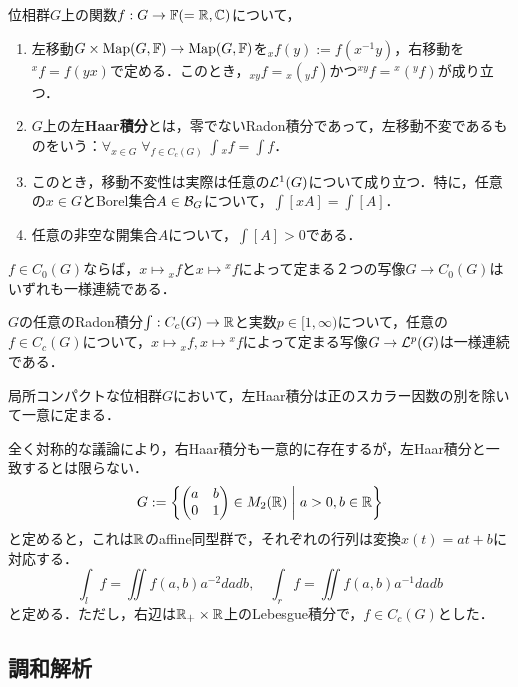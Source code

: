 \documentclass[uplatex,dvipdfmx]{jsreport}
\begin{document}
\begin{definition}
    位相群$G$上の関数$f:G\to\mathbb{F}(=\mathbb{R},\mathbb{C})$について，
    \begin{enumerate}
        \item 左移動$G\times\mathrm{Map}(G,\mathbb{F})\to\mathrm{Map}(G,\mathbb{F})$を${}_xf(y):=f(x^{-1}y)$，右移動を${}^xf=f(yx)$で定める．このとき，${}_{xy}f={}_x({}_yf)$かつ${}^{xy}f={}^x({}^yf)$が成り立つ．
        \item $G$上の左\textbf{Haar積分}とは，零でないRadon積分であって，左移動不変であるものをいう：$\forall_{x\in G}\;\forall_{f\in C_c(G)}\;\int{}_xf=\int f$．
        \item このとき，移動不変性は実際は任意の$\mathcal{L}^1(G)$について成り立つ．特に，任意の$x\in G$とBorel集合$A\in\mathcal{B}_G$について，$\int[xA]=\int[A]$．
        \item 任意の非空な開集合$A$について，$\int[A]>0$である．
    \end{enumerate}
\end{definition}

\begin{lemma}
    $f\in C_0(G)$ならば，$x\mapsto {}_xf$と$x\mapsto{}^xf$によって定まる２つの写像$G\to C_0(G)$はいずれも一様連続である．
\end{lemma}

\begin{lemma}
    $G$の任意のRadon積分$\int:C_c(G)\to\mathbb{R}$と実数$p\in[1,\infty)$について，任意の$f\in C_c(G)$について，$x\mapsto{}_xf,x\mapsto{}^xf$によって定まる写像$G\to\mathcal{L}^p(G)$は一様連続である．
\end{lemma}

\begin{theorem}[Haar]
    局所コンパクトな位相群$G$において，左Haar積分は正のスカラー因数の別を除いて一意に定まる．
\end{theorem}
\begin{remark}
    全く対称的な議論により，右Haar積分も一意的に存在するが，左Haar積分と一致するとは限らない．
    \[G:=\left\{\begin{pmatrix}a&b\\0&1\end{pmatrix}\in M_2(\mathbb{R})\;\middle|\;a>0,b\in\mathbb{R}\right\}\]
    と定めると，これは$\mathbb{R}$のaffine同型群で，それぞれの行列は変換$x(t)=at+b$に対応する．
    \[\int_lf=\iint f(a,b)a^{-2}dadb,\quad\int_rf=\iint f(a,b)a^{-1}dadb\]
    と定める．ただし，右辺は$\mathbb{R}_+\times\mathbb{R}$上のLebesgue積分で，$f\in C_c(G)$とした．
\end{remark}

\subsection{調和解析}
\end{document}

